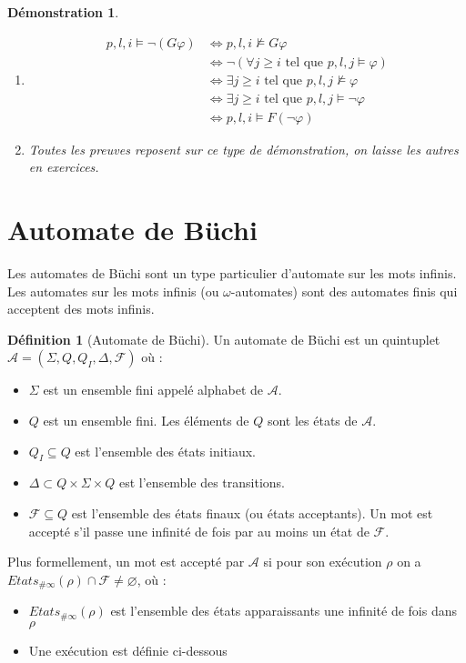 \documentclass[12pt,a4paper]{article}
\theoremstyle{plain}
\newtheorem{dem}{Démonstration}
\theoremstyle{definition}
\newtheorem{defi}{Définition}
\begin{document}
\begin{dem}
	\leavevmode 
	\begin{enumerate}
		\item[2.] 
		\begin{align*}
			 p,l,i \models \lnot (G \varphi) &\Leftrightarrow p,l,i \not \models G \varphi \\
			 &\Leftrightarrow \lnot (\forall j \geq i\textrm{ tel que } p,l,j \models \varphi) \\
			 &\Leftrightarrow \exists j \geq i \textrm{ tel que } p,l,j \not \models \varphi \\
			 &\Leftrightarrow \exists j \geq i \textrm{ tel que } p,l,j \models \lnot \varphi \\
			 &\Leftrightarrow p,l,i \models F (\lnot \varphi)
		\end{align*}	
		
		\item[] Toutes les preuves reposent sur ce type de démonstration, on laisse les autres en exercices.
	\end{enumerate}
\end{dem}



\section{Automate de Büchi}
Les automates de Büchi sont un type particulier d'automate sur les mots infinis.
Les automates sur les mots infinis (ou $\omega$-automates) sont des automates finis qui acceptent des mots infinis.

\begin{defi}[Automate de Büchi]
  Un automate de Büchi est un quintuplet $\mathcal{A}=(\Sigma, Q, Q_I, \Delta, \mathscr{F})$ où :
  \begin{itemize}
  \item $\Sigma$ est un ensemble fini appelé alphabet de $\mathcal{A}$.
  \item $Q$ est un ensemble fini. Les éléments de $Q$ sont les états de $\mathcal{A}$.
  \item $Q_I \subseteq Q$ est l'ensemble des états initiaux.
  \item $\Delta \subset Q \times \Sigma \times Q$ est l'ensemble des transitions.
  \item $\mathscr{F} \subseteq Q$ est l'ensemble des états finaux (ou états acceptants).
    Un mot est accepté s'il passe une infinité de fois par au moins un état de $\mathscr{F}$.
  \end{itemize}

  Plus formellement, un mot est accepté par $\mathcal{A}$ si pour son exécution $\rho$ on a $Etats_{\#\infty}(\rho) \cap \mathscr{F} \neq \varnothing$, où :
  \begin{itemize}
  \item $Etats_{\#\infty}(\rho)$ est l'ensemble des états apparaissants une infinité de fois dans $\rho$
  \item Une exécution est définie ci-dessous
  \end{itemize}
\end{defi}
\end{document}
